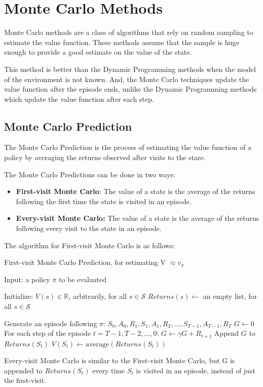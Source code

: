 \section{Monte Carlo Methods}

Monte Carlo methods are a class of algorithms that rely on random sampling to estimate the value function. These methods assume that the sample is huge enough to provide a good estimate on the value of the state.

This method is better than the Dynamic Programming methods when the model of the environment is not known. And, the Monte Carlo techniques update the value function after the episode ends, unlike the Dynamic Programming methods which update the value function after each step.

\subsection{Monte Carlo Prediction}

The Monte Carlo Prediction is the process of estimating the value function of a policy by averaging the returns observed after visits to the stare. 

The Monte Carlo Predictions can be done in two ways:
\begin{itemize}
    \item \textbf{First-visit Monte Carlo}: The value of a state is the average of the returns following the first time the state is visited in an episode.
    \item \textbf{Every-visit Monte Carlo:} The value of a state is the average of the returns following every visit to the state in an episode.
\end{itemize}

The algorithm for First-visit Monte Carlo is as follows:

\begin{algorithm}
    \caption{First-visit Monte Carlo Prediction, for estimating V $\approx v_\pi$}
    \begin{algorithmic}
        \State Input: a policy $\pi$ to be evaluated
    \end{algorithmic}
    \begin{algorithmic}
        \State Initialize:
        \State $V(s) \in \mathbb{R}$, arbitrarily, for all $s\in\mathcal{S}$
        \State $Returns(s) \leftarrow$ an empty list, for all $s\in\mathcal{S}$
    \end{algorithmic}
    \begin{algorithmic}
            \State Generate an episode following $\pi$: $S_0, A_0, R_1, S_1, A_1, R_2, \dots, S_{T-1}, A_{T-1}, R_T$
            \State $G \leftarrow 0$
            \State For each step of the episode $t=T-1, T-2, \dots, 0$:
            \State $G \leftarrow \gamma G + R_{t+1}$
                \State Append $G$ to $Returns(S_t)$
                \State $V(S_t) \leftarrow \text{average}(Returns(S_t))$
            \EndIf
        \EndWhile
    \end{algorithmic}
\end{algorithm}

Every-visit Monte Carlo is similar to the First-visit Monte Carlo, but G is appended to $Returns(S_t)$ every time $S_t$ is visited in an episode, instead of just the first-visit.
